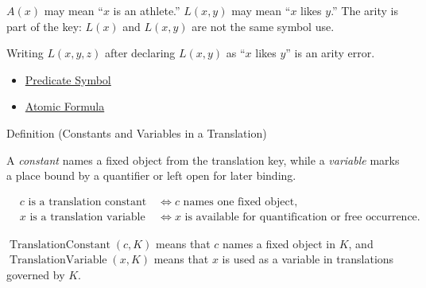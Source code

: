 \begin{remark*}[Examples]
\(A(x)\) may mean ``\(x\) is an athlete.'' \(L(x,y)\) may mean ``\(x\) likes
\(y\).'' The arity is part of the key: \(L(x)\) and \(L(x,y)\) are not the same
symbol use.
\end{remark*}

\begin{remark*}
Writing \(L(x,y,z)\) after declaring \(L(x,y)\) as ``\(x\) likes \(y\)'' is an
arity error.
\end{remark*}

\begin{dependencies}
\begin{itemize}
  \item \hyperref[def:predicate-symbol]{Predicate Symbol}
  \item \hyperref[def:atomic-formula]{Atomic Formula}
\end{itemize}
\end{dependencies}

\begin{definitionbox}{Definition (Constants and Variables in a Translation)}
\begin{definition}
\label{def:translation-constants-variables}
A \emph{constant} names a fixed object from the translation key, while a
\emph{variable} marks a place bound by a quantifier or left open for later
binding.
\end{definition}
\end{definitionbox}

\begin{remark*}
\[
\begin{aligned}
&c \text{ is a translation constant} &&\Longleftrightarrow c
  \text{ names one fixed object,}\\
&x \text{ is a translation variable} &&\Longleftrightarrow x
  \text{ is available for quantification or free occurrence.}
\end{aligned}
\]
\end{remark*}

\begin{remark*}
\(\operatorname{TranslationConstant}(c,K)\) means that \(c\) names a fixed
object in \(K\), and \(\operatorname{TranslationVariable}(x,K)\) means that
\(x\) is used as a variable in translations governed by \(K\).
\end{remark*}

